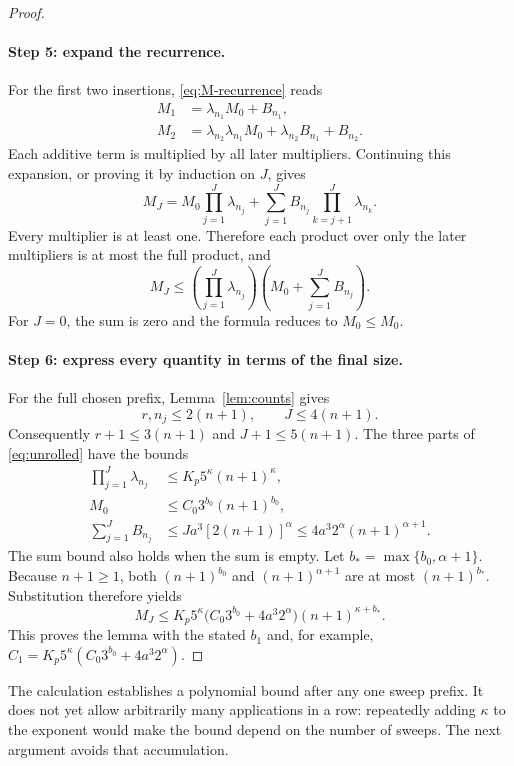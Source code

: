 \documentclass[11pt,a4paper]{article}
\theoremstyle{readable}
\begin{document}
\begin{proof}
\paragraph{Step 5: expand the recurrence.}
For the first two insertions, \eqref{eq:M-recurrence} reads
\begin{align*}
  M_1&=\lambda_{n_1}M_0+B_{n_1},\\
  M_2&=\lambda_{n_2}\lambda_{n_1}M_0
         +\lambda_{n_2}B_{n_1}+B_{n_2}.
\end{align*}
Each additive term is multiplied by all later multipliers. Continuing
this expansion, or proving it by induction on $J$, gives
\[
  M_J=M_0\prod_{j=1}^J\lambda_{n_j}
       +\sum_{j=1}^J B_{n_j}
          \prod_{k=j+1}^J\lambda_{n_k}.
\]
Every multiplier is at least one. Therefore each product over only
the later multipliers is at most the full product, and
\begin{equation}
  M_J\le
    \left(\prod_{j=1}^J\lambda_{n_j}\right)
    \left(M_0+\sum_{j=1}^J B_{n_j}\right).
  \label{eq:unrolled}
\end{equation}
For $J=0$, the sum is zero and the formula reduces to $M_0\le M_0$.

\paragraph{Step 6: express every quantity in terms of the final size.}
For the full chosen prefix, Lemma~\ref{lem:counts} gives
\[
  r,n_j\le2(n+1),\qquad J\le4(n+1).
\]
Consequently $r+1\le3(n+1)$ and $J+1\le5(n+1)$. The three parts
of \eqref{eq:unrolled} have the bounds
\begin{align*}
  \prod_{j=1}^J\lambda_{n_j}
    &\le K_p5^\kappa(n+1)^\kappa,\\
  M_0&\le C_0 3^{b_0}(n+1)^{b_0},\\
  \sum_{j=1}^J B_{n_j}
    &\le J a^3[2(n+1)]^\alpha
      \le4a^3 2^\alpha(n+1)^{\alpha+1}.
\end{align*}
The sum bound also holds when the sum is empty. Let
$b_* =\max\{b_0,\alpha+1\}$. Because $n+1\ge1$, both
$(n+1)^{b_0}$ and $(n+1)^{\alpha+1}$ are at most $(n+1)^{b_*}$.
Substitution therefore yields
\[
  M_J\le
    K_p5^\kappa\bigl(C_0 3^{b_0}+4a^3 2^\alpha\bigr)
    (n+1)^{\kappa+b_*}.
\]
This proves the lemma with the stated $b_1$ and, for example,
$C_1=K_p5^\kappa(C_0 3^{b_0}+4a^3 2^\alpha)$.\qedhere
\end{proof}

The calculation establishes a polynomial bound after any one sweep
prefix. It does not yet allow arbitrarily many applications in a row:
repeatedly adding $\kappa$ to the exponent would make the bound depend
on the number of sweeps. The next argument avoids that accumulation.
\end{document}

